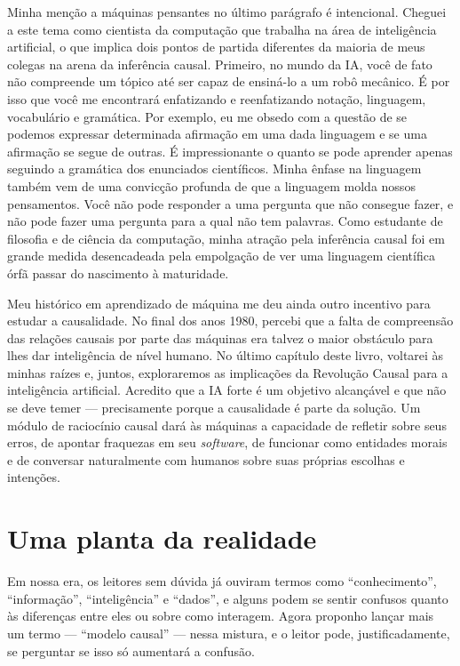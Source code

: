 \documentclass[11pt,a5paper,twoside]{book}
\begin{document}
Minha menção a máquinas pensantes no último parágrafo é intencional. Cheguei a este tema como cientista da computação que trabalha na área de inteligência artificial, o que implica dois pontos de partida diferentes da maioria de meus colegas na arena da inferência causal. Primeiro, no mundo da IA, você de fato não compreende um tópico até ser capaz de ensiná-lo a um robô mecânico. É por isso que você me encontrará enfatizando e reenfatizando notação, linguagem, vocabulário e gramática. Por exemplo, eu me obsedo com a questão de se podemos expressar determinada afirmação em uma dada linguagem e se uma afirmação se segue de outras. É impressionante o quanto se pode aprender apenas seguindo a gramática dos enunciados científicos. Minha ênfase na linguagem também vem de uma convicção profunda de que a linguagem molda nossos pensamentos. Você não pode responder a uma pergunta que não consegue fazer, e não pode fazer uma pergunta para a qual não tem palavras. Como estudante de filosofia e de ciência da computação, minha atração pela inferência causal foi em grande medida desencadeada pela empolgação de ver uma linguagem científica órfã passar do nascimento à maturidade.

Meu histórico em aprendizado de máquina me deu ainda outro incentivo para estudar a causalidade. No final dos anos 1980, percebi que a falta de compreensão das relações causais por parte das máquinas era talvez o maior obstáculo para lhes dar inteligência de nível humano. No último capítulo deste livro, voltarei às minhas raízes e, juntos, exploraremos as implicações da Revolução Causal para a inteligência artificial. Acredito que a IA forte é um objetivo alcançável e que não se deve temer — precisamente porque a causalidade é parte da solução. Um módulo de raciocínio causal dará às máquinas a capacidade de refletir sobre seus erros, de apontar fraquezas em seu \textit{software}, de funcionar como entidades morais e de conversar naturalmente com humanos sobre suas próprias escolhas e intenções.

\section{Uma planta da realidade}
Em nossa era, os leitores sem dúvida já ouviram termos como “conhecimento”, “informação”, “inteligência” e “dados”, e alguns podem se sentir confusos quanto às diferenças entre eles ou sobre como interagem. Agora proponho lançar mais um termo — “modelo causal” — nessa mistura, e o leitor pode, justificadamente, se perguntar se isso só aumentará a confusão.
\end{document}
